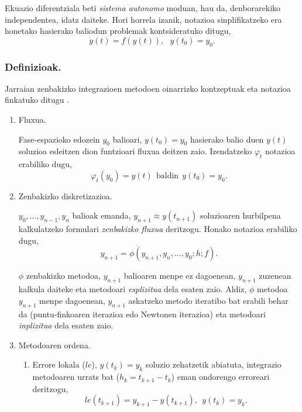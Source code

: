 Ekuazio diferentziala beti \emph{sistema autonomo} moduan, hau da, denborarekiko independentea, idatz daiteke. Hori horrela izanik, notazioa sinplifikatzeko era honetako hasierako baliodun problemak kontsideratuko ditugu,   
\begin{equation}
\label{eq:autonomo}
\dot{y}(t)=f(y(t)),\ \ \ y(t_0)=y_0.
\end{equation}

\subsubsection*{Definizioak.}  
Jarraian zenbakizko integrazioen metodoen oinarrizko kontzeptuak eta notazioa finkatuko ditugu \cite{Corless2013,Hairer2006}.
\begin{enumerate}
\item Fluxua.

Fase-espazioko edozein $y_0$ balioari, $y(t_0)=y_0$ hasierako balio duen $y(t)$ soluzioa esleitzen dion funtzioari fluxua deitzen zaio. Izendatzeko $\varphi_t$ notazioa erabiliko dugu,
\begin{equation*}
\label{eq:fluxua}
\varphi_t(y_0)=y(t) \ \ \mbox{baldin}  \ \  y(t_0)=y_0.
\end{equation*}

\item Zenbakizko diskretizazioa.

$y_0, \dots,y_{n-1},y_{n}$ balioak emanda, $y_{n+1}\approx y(t_{n+1})$ soluzioaren hurbilpena kalkulatzeko formulari \emph{zenbakizko fluxua} deritzogu. Honako notazioa erabiliko dugu,
\begin{equation*}\label{eq:204}
y_{n+1}=\phi(y_{n+1},y_{n},\dots,y_0;h;f).
\end{equation*}

$\phi$ zenbakizko metodoa, $y_{n+1}$ balioaren menpe ez dagoenean, $y_{n+1}$ zuzenean kalkula daiteke eta metodoari \emph{esplizitua} dela esaten zaio. Aldiz, $\phi$ metodoa $y_{n+1}$ menpe dagoenean, $y_{n+1}$ askatzeko metodo iteratibo bat erabili behar da (puntu-finkoaren iterazioa edo Newtonen iterazioa) eta metodoari \emph{inplizitua} dela esaten zaio.  

\item Metodoaren ordena.

\begin{enumerate}
\item Errore lokala ($le$), $y(t_k)=y_k$ soluzio zehatzetik abiatuta, integrazio metodoaren urrats bat ($h_k=t_{k+1}-t_k$) eman ondorengo erroreari deritzogu,
\begin{equation*}
\label{eq:le}
le(t_{k+1})=y_{k+1}-y(t_{k+1}), \ \ y(t_k)=y_k.
\end{equation*}   



\end{enumerate}
\end{enumerate}
